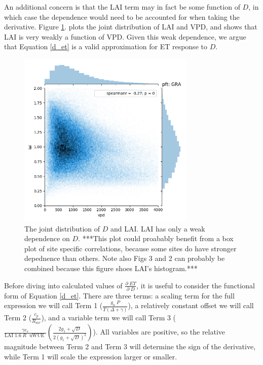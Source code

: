 \documentclass[draft,linenumbers]{agujournal}
\begin{document}
An additional concern is that the LAI term may in fact be some function of $D$, in which case the dependence would need to be accounted for when taking the derivative. Figure \ref{lai_vpd_fig}. plots the joint distribution of LAI and VPD, and shows that LAI is very weakly a function of VPD. Given this weak dependence, we argue that Equation \ref{d_et} is a valid approximation for ET response to $D$.

\begin{figure}[h]
\centering
\includegraphics[width=20pc]{./fig03.png}
\caption{The joint distribution of $D$ and LAI. LAI has only a weak dependence on $D$. ***This plot could proabably benefit from a box plot of site specific correlations, because some sites do have stronger depednence than others. Note also Figs 3 and 2 can probably be combined because this figure shoes LAI's histogram.***}
\label{lai_vpd_fig}
\end{figure}


Before diving into calculated values of $\frac{\partial \; ET}{\partial \; D}$, it is useful to consider the functional form of Equation \ref{d_et}. There are three terms: a scaling term for the full expression we will call Term 1 ($\frac{g_a \; P}{T(\Delta + \gamma)}$), a relatively constant offset we will call Term 2 ($\frac{c_p}{R_{air}}$), and a variable term we will call Term 3 ($\frac{\gamma c_s }{\text{LAI }1.6 \; R\; \text{ uWUE }} \left( \frac{2 g_1 + \sqrt{D}}{2 (g_1 + \sqrt{D})^2}\right)$). All variables are positive, so the relative magnitude between Term 2 and Term 3 will determine the sign of the derivative, while Term 1 will scale the expression larger or smaller.
\end{document}
